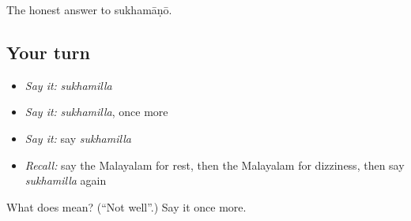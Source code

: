 \begin{grammarlens}[title={What you've built}]
The honest answer to sukhamāṇō.
\end{grammarlens}

\subsection*{Your turn}
\begin{itemize}
\raggedright
  \item \emph{Say it:} \emph{sukhamilla}
  \item \emph{Say it:} \emph{sukhamilla}, once more
  \item \emph{Say it:} say \emph{sukhamilla}
  \item \emph{Recall:} say the Malayalam for rest, then the Malayalam for dizziness, then say \emph{sukhamilla} again
\end{itemize}

\begin{tcolorbox}[breakable,colback=teal!4,colframe=teal!35!black,title={Before you move on}]
What does  mean? (\textquotedblleft{}Not well\textquotedblright{}.) Say it once more.
\end{tcolorbox}
